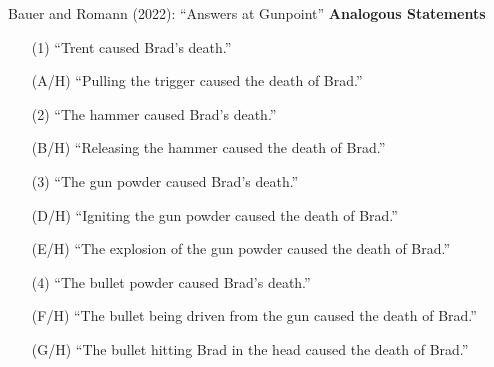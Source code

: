 \documentclass[xcolor=table,9pt,aspectratio=169]{beamer}
\begin{document}
\begin{frame}{\vspace*{10mm}Bauer and Romann (2022): ``Answers at Gunpoint''}
\vspace*{-5mm}
\textbf{Analogous Statements}\\
\begin{itemize}
   \item[(1)] ``Trent caused Brad's death.''
   \item[(A/H)] ``Pulling the trigger caused the death of Brad.''
\end{itemize}
\vspace*{0.5em}
\begin{itemize}
   \item[(2)] ``The hammer caused Brad's death.''
   \item[(B/H)] ``Releasing the hammer caused the death of Brad.''
\end{itemize}
\vspace*{0.5em}
\begin{itemize}
   \item[(3)] ``The gun powder caused Brad's death.''
   \item[(D/H)] ``Igniting the gun powder caused the death of Brad.''
   \item[(E/H)] ``The explosion of the gun powder caused the death of Brad.''
\end{itemize}
\vspace*{0.5em}
\begin{itemize}
   \item[(4)] ``The bullet powder caused Brad's death.''
   \item[(F/H)] ``The bullet being driven from the gun caused the death of Brad.''
   \item[(G/H)] ``The bullet hitting Brad in the head caused the death of Brad.''
\end{itemize}
\end{frame}
\end{document}
